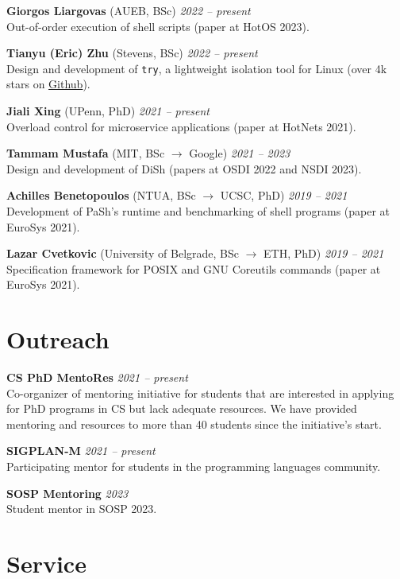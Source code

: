 \documentclass[margin]{res}
\begin{document}
\begin{resume}
\textbf{Giorgos Liargovas} (AUEB, BSc) \hfill {\em 2022 -- present} \\
Out-of-order execution of shell scripts (paper at HotOS 2023).

\textbf{Tianyu (Eric) Zhu} (Stevens, BSc) \hfill {\em 2022 -- present} \\
Design and development of \texttt{try}, a lightweight isolation tool for Linux (over 4k stars on \href{https://github.com/binpash/try}{Github}).

\textbf{Jiali Xing} (UPenn, PhD) \hfill {\em 2021 -- present} \\
Overload control for microservice applications (paper at HotNets 2021).

\textbf{Tammam Mustafa} (MIT, BSc $\rightarrow$ Google) \hfill {\em 2021 -- 2023} \\
Design and development of DiSh (papers at OSDI 2022 and NSDI 2023).

\textbf{Achilles Benetopoulos} (NTUA, BSc $\rightarrow$ UCSC, PhD) \hfill {\em 2019 -- 2021} \\
Development of PaSh's runtime and benchmarking of shell programs (paper at EuroSys 2021). 

\textbf{Lazar Cvetkovic} (University of Belgrade, BSc $\rightarrow$ ETH, PhD) \hfill {\em 2019 -- 2021} \\
Specification framework for POSIX and GNU Coreutils commands (paper at EuroSys 2021). 


\section{Outreach}

\textbf{CS PhD MentoRes}  \hfill {\em 2021 -- present} \\
Co-organizer of mentoring initiative for students that are interested in applying for PhD programs in CS but lack adequate resources. We have provided mentoring and resources to more than 40 students since the initiative's start.

\textbf{SIGPLAN-M}  \hfill {\em 2021 -- present} \\
Participating mentor for students in the programming languages community.

\textbf{SOSP Mentoring}  \hfill {\em 2023} \\
Student mentor in SOSP 2023.

\section{Service}


\end{resume}
\end{document}
